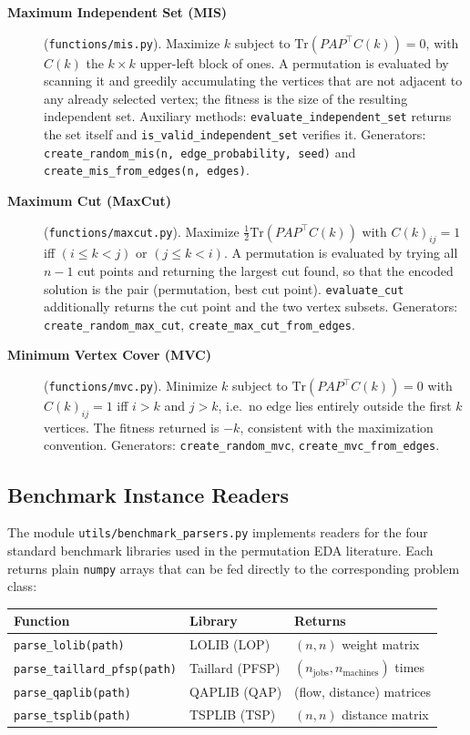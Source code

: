 \documentclass[a4paper,11pt]{article}
\begin{document}
\begin{description}
  \item[\textbf{Maximum Independent Set (MIS)}] (\texttt{functions/mis.py}).
    Maximize $k$ subject to $\mathrm{Tr}(P A P^\top C(k)) = 0$, with $C(k)$ the
    $k\times k$ upper-left block of ones.  A permutation is evaluated by scanning
    it and greedily accumulating the vertices that are not adjacent to any
    already selected vertex; the fitness is the size of the resulting independent
    set.  Auxiliary methods: \texttt{evaluate\_independent\_set} returns the set
    itself and \texttt{is\_valid\_independent\_set} verifies it.  Generators:
    \texttt{create\_random\_mis(n, edge\_probability, seed)} and
    \texttt{create\_mis\_from\_edges(n, edges)}.
  \item[\textbf{Maximum Cut (MaxCut)}] (\texttt{functions/maxcut.py}).  Maximize
    $\tfrac12\mathrm{Tr}(P A P^\top C(k))$ with
    $C(k)_{ij} = 1$ iff $(i \leq k < j)$ or $(j \leq k < i)$.  A permutation is
    evaluated by trying all $n-1$ cut points and returning the largest cut found,
    so that the encoded solution is the pair (permutation, best cut point).
    \texttt{evaluate\_cut} additionally returns the cut point and the two vertex
    subsets.  Generators: \texttt{create\_random\_max\_cut},
    \texttt{create\_max\_cut\_from\_edges}.
  \item[\textbf{Minimum Vertex Cover (MVC)}] (\texttt{functions/mvc.py}).
    Minimize $k$ subject to $\mathrm{Tr}(P A P^\top C(k)) = 0$ with
    $C(k)_{ij} = 1$ iff $i>k$ and $j>k$, i.e.\ no edge lies entirely outside the
    first $k$ vertices.  The fitness returned is $-k$, consistent with the
    maximization convention.  Generators: \texttt{create\_random\_mvc},
    \texttt{create\_mvc\_from\_edges}.
\end{description}

\subsection{Benchmark Instance Readers}

The module \texttt{utils/benchmark\_parsers.py} implements readers for the four
standard benchmark libraries used in the permutation EDA literature.  Each
returns plain \texttt{numpy} arrays that can be fed directly to the corresponding
problem class:

\begin{center}
\begin{tabular}{lll}
\toprule
Function & Library & Returns \\
\midrule
\texttt{parse\_lolib(path)} & LOLIB (LOP) & $(n,n)$ weight matrix \\
\texttt{parse\_taillard\_pfsp(path)} & Taillard (PFSP) & $(n_{\text{jobs}}, n_{\text{machines}})$ times \\
\texttt{parse\_qaplib(path)} & QAPLIB (QAP) & (flow, distance) matrices \\
\texttt{parse\_tsplib(path)} & TSPLIB (TSP) & $(n,n)$ distance matrix \\
\bottomrule
\end{tabular}
\end{center}
\end{document}
